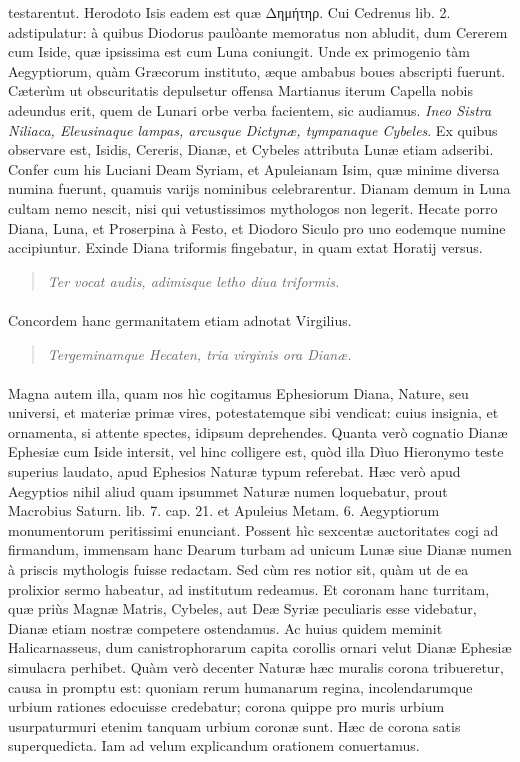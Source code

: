 \documentclass[a4paper, 11pt, oneside, polutonikogreek, latin]{article}
\begin{document}
testarentut. Herodoto Isis eadem est quæ Δημήτηρ. Cui Cedrenus lib. 2. adstipulatur: à quibus Diodorus paulòante memoratus non abludit, dum Cererem cum Iside, quæ ipsissima est cum Luna coniungit. Unde ex primogenio tàm Aegyptiorum, quàm Græcorum instituto, æque ambabus boues abscripti fuerunt. Cæterùm ut obscuritatis depulsetur offensa Martianus iterum Capella nobis adeundus erit, quem de Lunari orbe verba facientem, sic audiamus. \emph{Ineo Sistra Niliaca, Eleusinaque lampas, arcusque Dictynæ, tympanaque Cybeles}. Ex quibus observare est, Isidis, Cereris, Dianæ, et Cybeles attributa Lunæ etiam adseribi. Confer cum his Luciani Deam Syriam, et Apuleianam Isim, quæ minime diversa numina fuerunt, quamuis varijs nominibus celebrarentur. Dianam demum in Luna cultam nemo nescit, nisi qui vetustissimos mythologos non legerit. Hecate porro Diana, Luna, et Proserpina à Festo, et Diodoro Siculo pro uno eodemque numine accipiuntur. Exinde Diana triformis fingebatur, in quam extat Horatij versus.
\begin{quote}
\emph{Ter vocat audis, adimisque letho diua triformis.}
\end{quote}
\vspace*{-4mm}
\paragraph{}
Concordem hanc germanitatem etiam adnotat Virgilius.
\begin{quote}
\emph{Tergeminamque Hecaten, tria virginis ora Dianæ.}
\end{quote}
\vspace*{-4mm}
\paragraph{}
Magna autem illa, quam nos hìc cogitamus Ephesiorum Diana, Nature, seu universi, et materiæ primæ vires, potestatemque sibi vendicat: cuius insignia, et ornamenta, si attente spectes, idipsum deprehendes. Quanta verò cognatio Dianæ Ephesiæ cum Iside intersit, vel hinc colligere est, quòd illa Dìuo Hieronymo teste superius laudato, apud Ephesios Naturæ typum referebat. Hæc verò apud Aegyptios nihil aliud quam ipsummet Naturæ numen loquebatur, prout Macrobius Saturn. lib. 7. cap. 21. et Apuleius Metam. 6. Aegyptiorum monumentorum peritissimi enunciant. Possent hìc sexcentæ auctoritates cogi ad firmandum, immensam hanc Dearum turbam ad unicum Lunæ siue Dianæ numen à priscis mythologis fuisse redactam. Sed cùm res notior sit, quàm ut de ea prolixior sermo habeatur, ad institutum redeamus. Et coronam hanc turritam, quæ priùs Magnæ Matris, Cybeles, aut Deæ Syriæ peculiaris esse videbatur, Dianæ etiam nostræ competere ostendamus. Ac huius quidem meminit Halicarnasseus, dum canistrophorarum capita corollis ornari velut Dianæ Ephesiæ simulacra perhibet. Quàm verò decenter Naturæ hæc muralis corona tribueretur, causa in promptu est: quoniam rerum humanarum regina, incolendarumque urbium rationes edocuisse credebatur; corona quippe pro muris urbium usurpaturmuri etenim tanquam urbium coronæ sunt. Hæc de corona satis superquedicta. Iam ad velum explicandum orationem conuertamus.
\clearpage
\end{document}
